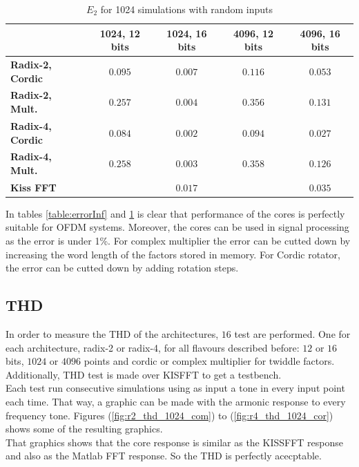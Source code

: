 \documentclass[conference]{IEEEtran}
\begin{document}
\begin{table}[htb!]
\begin{tabular}{l c c c c }
 & \textbf{1024, 12 bits} & \textbf{1024, 16 bits} & \textbf{4096, 12 bits} & \textbf{4096, 16 bits}\\ \hline 
\textbf{Radix-2, Cordic} & $0.095$ & $0.007$ & $0.116$ & $0.053$\\
\textbf{Radix-2, Mult.} & $0.257$ & $0.004$ & $0.356$ & $0.131$\\
\textbf{Radix-4, Cordic} & $0.084$ & $0.002$ & $0.094$ & $0.027$\\
\textbf{Radix-4, Mult.} & $0.258$ & $0.003$ & $0.358$ & $0.126$\\ 
\textbf{Kiss FFT} & $ $ & $0.017$ & $ $ & $0.035$\\\hline
\end{tabular}
\caption{$E_2$ for 1024 simulations with random inputs}
\label{table:error2}
\end{table}
 
In tables \ref{table:errorInf} and \ref{table:error2} is clear that performance of the cores is perfectly suitable for OFDM systems. Moreover, 
the cores can be used in signal processing as the error is under 1\%. For complex multiplier the error can be cutted down by increasing the word 
length of the factors stored in memory. For Cordic rotator, the error can be cutted down by adding rotation steps.\\

\subsection{THD}

In order to measure the THD of the architectures, $16$ test are performed. One for each architecture, radix-2 or radix-4, for all flavours 
described before: $12$ or $16$ bits, $1024$ or $4096$ points and cordic or complex multiplier for twiddle factors. Additionally, THD test is made 
over KISFFT to get a testbench.\\
Each test run consecutive simulations using as input a tone in every input point each time. That way, a graphic can be made with 
the armonic response to every frequency tone. Figures (\ref{fig:r2_thd_1024_com}) to (\ref{fig:r4_thd_1024_cor}) shows some of the 
resulting graphics.\\
That graphics shows that the core response is similar as the KISSFFT response and also as the Matlab FFT response. So the THD 
is perfectly acecptable.
\end{document}

